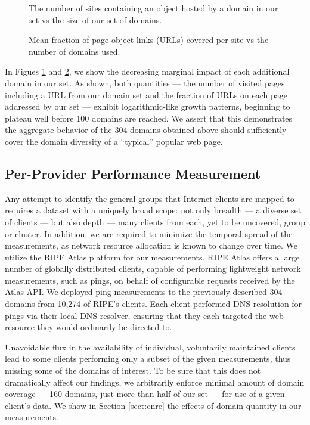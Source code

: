 \begin{figure}
    \caption{The number of sites containing an object hosted by a domain in our set vs
    the size of our set of domains.}
    \label{fig:sitescovered}
\end{figure}

\begin{figure}
    \caption{Mean fraction of page object links (URLs) covered per site vs the
    number of domains used.
    }
    \label{fig:linkscovered}
\end{figure}

In Figues \ref{fig:sitescovered} and \ref{fig:linkscovered}, we show the
decreasing marginal impact of each additional domain in our set. As shown, both
quantities --- the number of visited pages including a URL from our domain set and the
fraction of URLs on each page addressed by our set --- exhibit logarithmic-like
growth patterns, beginning to plateau well before 100 domains are reached. We
assert that this demonstrates the aggregate behavior of the 304 domains obtained above
should sufficiently cover the domain diversity of a ``typical'' popular web page. 


\subsection{Per-Provider Performance Measurement}

Any attempt to identify the general groups that Internet clients are mapped to
requires a dataset with a uniquely broad scope: not only breadth --- a diverse
set of clients --- but also depth --- many clients from each, yet to be
uncovered, group or cluster. In addition, we are required to minimize the
temporal spread of the measurements, as network resource allocation is known to
change over time. We utilize the RIPE Atlas platform \cite{ripe-atlas} for our measurements.
RIPE Atlas offers a large number of globally distributed clients, capable of
performing lightweight network measurements, such as pings, on behalf of
configurable requests received by the Atlas API. We deployed ping measurements
to the previously described 304 domains from 10,274 of RIPE's clients. Each
client performed DNS resolution for pings via their local DNS resolver, ensuring
that they each targeted the web resource they would ordinarily be directed to.

Unavoidable flux in the availability of individual, voluntarily maintained
clients lead to some clients performing only a subset of the given
measurements, thus missing some of the domains of interest. To be sure that this
does not dramatically affect our findings, we arbitrarily enforce minimal amount
of domain coverage --- 160 domains, just more than half of our set --- for use
of a given client's data. We show in Section \ref{sect:cnre} the effects of domain quantity
in our measurements.
